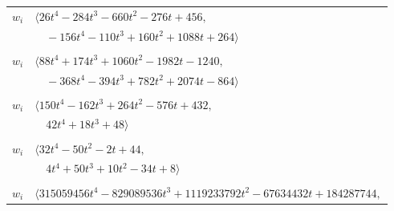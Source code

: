 \documentclass[11pt]{article}
\begin{document}
\begin{longtable}{@{}ll@{}}
$w_i$ & $\langle 26t^{4}-284t^{3}-660t^{2}-276t+456,$\\
 & $\quad -156t^{4}-110t^{3}+160t^{2}+1088t+264\rangle$\\
\addlinespace[2pt]
\multicolumn{2}{@{}p{0.97\textwidth}@{}}{$i=59$, $D_i=1$, $\rho_{ij}$: $4{:}1, \allowbreak 8{:}2, \allowbreak 16{:}2, \allowbreak 17{:}3, \allowbreak 20{:}3, \allowbreak 23{:}3, \allowbreak 24{:}2, \allowbreak 26{:}1, \allowbreak 27{:}3, \allowbreak 36{:}2, \allowbreak 41{:}3, \allowbreak 44{:}1, \allowbreak 51{:}1, \allowbreak 57{:}1, \allowbreak 66{:}1, \allowbreak 77{:}2$}\\
$w_i$ & $\langle 88t^{4}+174t^{3}+1060t^{2}-1982t-1240,$\\
 & $\quad -368t^{4}-394t^{3}+782t^{2}+2074t-864\rangle$\\
\addlinespace[2pt]
\multicolumn{2}{@{}p{0.97\textwidth}@{}}{$i=60$, $D_i=1$, $\rho_{ij}$: $11{:}1, \allowbreak 14{:}3, \allowbreak 15{:}1, \allowbreak 21{:}3, \allowbreak 23{:}2, \allowbreak 34{:}3, \allowbreak 35{:}1, \allowbreak 38{:}2, \allowbreak 41{:}3, \allowbreak 48{:}1, \allowbreak 53{:}3, \allowbreak 54{:}1, \allowbreak 56{:}2, \allowbreak 64{:}2, \allowbreak 77{:}1$}\\
$w_i$ & $\langle 150t^{4}-162t^{3}+264t^{2}-576t+432,$\\
 & $\quad 42t^{4}+18t^{3}+48\rangle$\\
\addlinespace[2pt]
\multicolumn{2}{@{}p{0.97\textwidth}@{}}{$i=61$, $D_i=1$, $\rho_{ij}$: $1{:}3, \allowbreak 10{:}3, \allowbreak 12{:}3, \allowbreak 25{:}1, \allowbreak 29{:}3, \allowbreak 36{:}3, \allowbreak 41{:}1, \allowbreak 55{:}1, \allowbreak 62{:}3, \allowbreak 64{:}1$}\\
$w_i$ & $\langle 32t^{4}-50t^{2}-2t+44,$\\
 & $\quad 4t^{4}+50t^{3}+10t^{2}-34t+8\rangle$\\
\addlinespace[2pt]
\multicolumn{2}{@{}p{0.97\textwidth}@{}}{$i=62$, $D_i=1$, $e_i=2$, $\rho_{ij}$: $1{:}3, \allowbreak 2{:}2, \allowbreak 7{:}2, \allowbreak 8{:}1, \allowbreak 10{:}3, \allowbreak 15{:}3, \allowbreak 24{:}1, \allowbreak 26{:}1, \allowbreak 27{:}2, \allowbreak 28{:}3, \allowbreak 30{:}1, \allowbreak 32{:}2, \allowbreak 34{:}3, \allowbreak 35{:}2, \allowbreak 36{:}1, \allowbreak 37{:}1, \allowbreak 40{:}1, \allowbreak 45{:}3, \allowbreak 53{:}2, \allowbreak 57{:}3, \allowbreak 61{:}1, \allowbreak 67{:}2, \allowbreak 68{:}2, \allowbreak 70{:}2, \allowbreak 72{:}3, \allowbreak 76{:}3$}\\
$w_i$ & $\langle 315059456t^{4}-829089536t^{3}+1119233792t^{2}-67634432t+184287744,$\\

\end{longtable}
\end{document}
